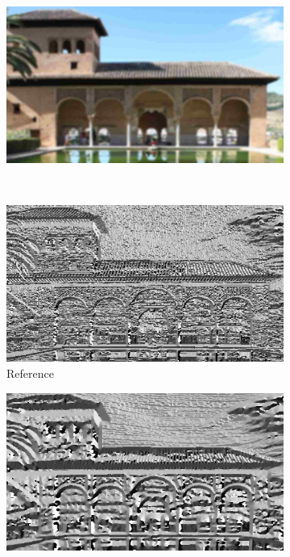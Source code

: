 \begin{figure}
\begin{subfigure}[b]{0.24\textwidth}
     \end{subfigure}
     \hfill
     \begin{subfigure}[b]{0.24\textwidth}
         \centering
         \includegraphics[width= \textwidth]{./figs/blur3_jpeg3}
     \end{subfigure}\\
     \begin{subfigure}[b]{0.24\textwidth}
         \centering
         \includegraphics[width=\textwidth]{./figs/dir_ref}
         \caption{Reference}
     \end{subfigure}
     \hfill
     \begin{subfigure}[b]{0.24\textwidth}
         \centering
         \includegraphics[width=\textwidth]{./figs/dir_blur3}

\end{subfigure}
\end{figure}

